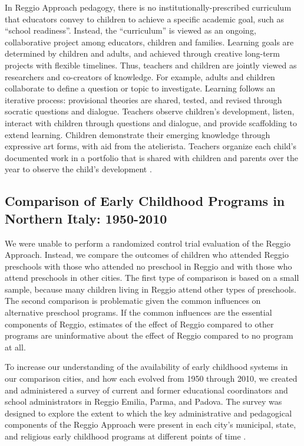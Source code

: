 In Reggio Approach pedagogy, there is no institutionally-prescribed curriculum that educators convey to children to achieve a specific academic goal, such as ``school readiness''. Instead, the ``curriculum'' is viewed as an ongoing, collaborative project among educators, children and families. Learning goals are determined by children and adults, and achieved through creative long-term projects with flexible timelines. Thus, teachers and children are jointly viewed as researchers and co-creators of knowledge. For example, adults and children collaborate to define a question or topic to investigate. Learning follows an iterative process: provisional theories are shared, tested, and revised through socratic questions and dialogue. Teachers observe children's development, listen, interact with children through questions and dialogue, and provide scaffolding to extend learning. Children demonstrate their emerging knowledge through expressive art forms, with aid from the atelierista. Teachers organize each child's documented work in a portfolio that is shared with children and parents over the year to observe the child's development \citep{Rinaldi_2006_ReggioEmilia_BOOK,Giudici-Nicolosi_2014_Reggio-Approach}.

\subsection{Comparison of Early Childhood Programs in Northern Italy: 1950-2010}

We were unable to perform a randomized control trial evaluation of the Reggio Approach. Instead, we compare the outcomes of children who attended Reggio preschools with those who attended no preschool in Reggio and with those who attend preschools in other cities. The first type of comparison is based on a small sample, because many children living in Reggio attend other types of preschools. The second comparison is problematic given the common influences on alternative preschool programs. If the common influences are the essential components of Reggio, estimates of the effect of Reggio compared to other programs are uninformative about the effect of Reggio compared to no program at all.

To increase our understanding of the availability of early childhood systems in our comparison cities, and how each evolved from 1950 through 2010, we created and administered a survey of current and former educational coordinators and school administrators in Reggio Emilia, Parma, and Padova. The survey was designed to explore the extent to which the key administrative and pedagogical components of the Reggio Approach were present in each city's municipal, state, and religious early childhood programs at different points of time \citep{CEHD_2016_Historical-Analysis}.

